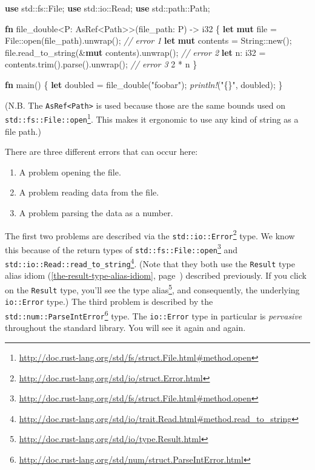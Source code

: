\documentclass[a4paper,]{book}
\renewcommand*{\hyperlink}[2]{%
 #2 (\autoref{#1}, page~\pageref{#1})}
\newenvironment{Shaded}{\begin{snugshade}}{\end{snugshade}}
\newcommand{\KeywordTok}[1]{\textcolor[rgb]{0.13,0.29,0.53}{\textbf{{#1}}}}
\newcommand{\DataTypeTok}[1]{\textcolor[rgb]{0.13,0.29,0.53}{{#1}}}
\newcommand{\DecValTok}[1]{\textcolor[rgb]{0.00,0.00,0.81}{{#1}}}
\newcommand{\StringTok}[1]{\textcolor[rgb]{0.31,0.60,0.02}{{#1}}}
\newcommand{\CommentTok}[1]{\textcolor[rgb]{0.56,0.35,0.01}{\textit{{#1}}}}
\newcommand{\PreprocessorTok}[1]{\textcolor[rgb]{0.56,0.35,0.01}{\textit{{#1}}}}
\newcommand{\NormalTok}[1]{{#1}}
\renewcommand{\href}[2]{#2\footnote{\url{#1}}}
\providecommand{\tightlist}{%
  \setlength{\itemsep}{0pt}\setlength{\parskip}{0pt}}
\begin{document}
\begin{Shaded}
\begin{Highlighting}[]
\KeywordTok{use} \NormalTok{std::fs::File;}
\KeywordTok{use} \NormalTok{std::io::Read;}
\KeywordTok{use} \NormalTok{std::path::Path;}

\KeywordTok{fn} \NormalTok{file_double<P: AsRef<Path>>(file_path: P) -> }\DataTypeTok{i32} \NormalTok{\{}
    \KeywordTok{let} \KeywordTok{mut} \NormalTok{file = File::open(file_path).unwrap(); }\CommentTok{// error 1}
    \KeywordTok{let} \KeywordTok{mut} \NormalTok{contents = }\DataTypeTok{String}\NormalTok{::new();}
    \NormalTok{file.read_to_string(&}\KeywordTok{mut} \NormalTok{contents).unwrap(); }\CommentTok{// error 2}
    \KeywordTok{let} \NormalTok{n: }\DataTypeTok{i32} \NormalTok{= contents.trim().parse().unwrap(); }\CommentTok{// error 3}
    \DecValTok{2} \NormalTok{* n}
\NormalTok{\}}

\KeywordTok{fn} \NormalTok{main() \{}
    \KeywordTok{let} \NormalTok{doubled = file_double(}\StringTok{"foobar"}\NormalTok{);}
    \PreprocessorTok{println!}\NormalTok{(}\StringTok{"\{\}"}\NormalTok{, doubled);}
\NormalTok{\}}
\end{Highlighting}
\end{Shaded}

(N.B. The \texttt{AsRef\textless{}Path\textgreater{}} is used because
those are the
\href{http://doc.rust-lang.org/std/fs/struct.File.html\#method.open}{same
bounds used on \texttt{std::fs::File::open}}. This makes it ergonomic to
use any kind of string as a file path.)

There are three different errors that can occur here:

\begin{enumerate}
\def\labelenumi{\arabic{enumi}.}
\tightlist
\item
  A problem opening the file.
\item
  A problem reading data from the file.
\item
  A problem parsing the data as a number.
\end{enumerate}

The first two problems are described via the
\href{http://doc.rust-lang.org/std/io/struct.Error.html}{\texttt{std::io::Error}}
type. We know this because of the return types of
\href{http://doc.rust-lang.org/std/fs/struct.File.html\#method.open}{\texttt{std::fs::File::open}}
and
\href{http://doc.rust-lang.org/std/io/trait.Read.html\#method.read_to_string}{\texttt{std::io::Read::read\_to\_string}}.
(Note that they both use the
\protect\hyperlink{the-result-type-alias-idiom}{\texttt{Result} type
alias idiom} described previously. If you click on the \texttt{Result}
type, you'll \href{http://doc.rust-lang.org/std/io/type.Result.html}{see
the type alias}, and consequently, the underlying \texttt{io::Error}
type.) The third problem is described by the
\href{http://doc.rust-lang.org/std/num/struct.ParseIntError.html}{\texttt{std::num::ParseIntError}}
type. The \texttt{io::Error} type in particular is \emph{pervasive}
throughout the standard library. You will see it again and again.
\end{document}
